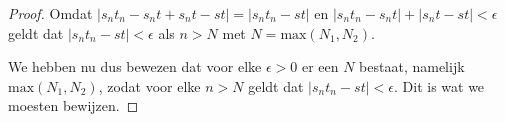 \begin{proof}
\noindent Omdat $|s_{n}t_{n}-s_{n}t+s_{n}t-st|=|s_{n}t_{n}-st|$ en $|s_{n}t_{n}-s_{n}t|+|s_{n}t-st|<\epsilon$ geldt dat $|s_{n}t_{n}-st|<\epsilon$ als $n>N$ met $N=\text{max}(N_{1},N_{2})$. \bigskip

\noindent We hebben nu dus bewezen dat voor elke $\epsilon>0$ er een $N$ bestaat, namelijk $\text{max}(N_{1},N_{2})$, zodat voor elke $n>N$ geldt dat $|s_{n}t_{n}-st|<\epsilon$. Dit is wat we moesten bewijzen.

\end{proof}